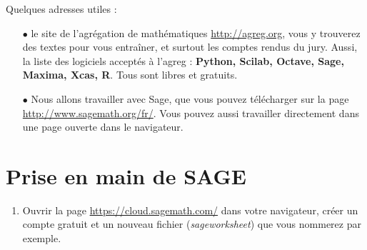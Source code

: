 Quelques adresses utiles :
\begin{itemize}
\item[$\bullet$]le site de l'agrégation de mathématiques \url{http://agreg.org}, vous y trouverez des textes pour vous entraîner, et surtout les comptes rendus du jury. Aussi, la liste des logiciels acceptés à l'agreg : \textbf{Python, Scilab, Octave, Sage, Maxima, Xcas, R}. Tous sont libres et gratuits.
\item[$\bullet$]Nous allons travailler avec Sage, que vous pouvez télécharger sur la page \url{http://www.sagemath.org/fr/}. Vous pouvez aussi travailler directement dans une page ouverte dans le navigateur.
\end{itemize}

\section{Prise en main de SAGE}

\begin{enumerate}
\item Ouvrir la page \url{https://cloud.sagemath.com/} dans votre navigateur, créer un compte gratuit et un nouveau fichier (\textit{sageworksheet}) que vous nommerez  par exemple.

\end{enumerate}